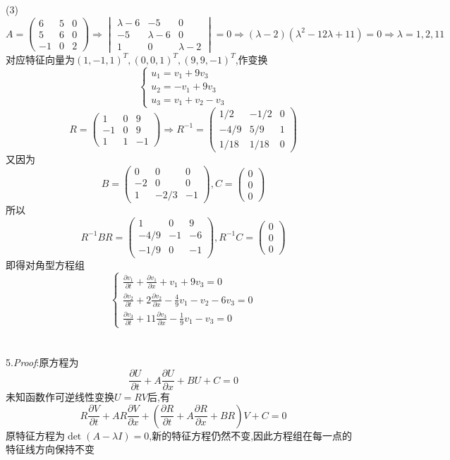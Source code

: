 (3)\[A=
\begin{pmatrix}
6&5&0\\5&6&0\\-1&0&2
\end{pmatrix}\Rightarrow
\begin{vmatrix}
\lambda-6&-5&0\\-5&\lambda-6&0\\1&0&\lambda-2
\end{vmatrix}=0\Rightarrow(\lambda-2)(\lambda^2-12\lambda+11)=0\Rightarrow\lambda=1,2,11\]
对应特征向量为$(1,-1,1)^T,(0,0,1)^T,(9,9,-1)^T$,作变换
\[\begin{cases}
u_1=v_1+9v_3\\
u_2=-v_1+9v_3\\
u_3=v_1+v_2-v_3
\end{cases}\]
\[R=\begin{pmatrix}
1&0&9\\-1&0&9\\1&1&-1
\end{pmatrix}
\Rightarrow
R^{-1}=
\begin{pmatrix}
1/2&-1/2&0\\-4/9&5/9&1\\1/18&1/18&0
\end{pmatrix}\]
又因为
\[B=\begin{pmatrix}
0&0&0\\-2&0&0\\1&-2/3&-1
\end{pmatrix},C=\begin{pmatrix}
0\\0\\0
\end{pmatrix}\]
所以
\[R^{-1}BR=\begin{pmatrix}
1&0&9\\-4/9&-1&-6\\-1/9&0&-1
\end{pmatrix},R^{-1}C=\begin{pmatrix}
0\\0\\0
\end{pmatrix}\]
即得对角型方程组
\[\begin{cases}
\frac{\partial v_1}{\partial t}+\frac{\partial v_1}{\partial x}+v_1+9v_3=0\\
\frac{\partial v_2}{\partial t}+2\frac{\partial v_2}{\partial x}-\frac{4}{9}v_1-v_2-6v_3=0\\
\frac{\partial v_3}{\partial t}+11\frac{\partial v_3}{\partial x}-\frac{1}{9}v_1-v_3=0
\end{cases}\]\\\\
5.\textit{Proof}:原方程为
\[\frac{\partial U}{\partial t}+A\frac{\partial U}{\partial x}+BU+C=0\]
未知函数作可逆线性变换$U=RV$后,有
\[R\frac{\partial V}{\partial t}+AR\frac{\partial V}{\partial x}+\left(\frac{\partial R}{\partial t}+A\frac{\partial R}{\partial x}+BR\right)V+C=0\]
原特征方程为$\det(A-\lambda I)=0$,新的特征方程仍然不变,因此方程组在每一点的特征线方向保持不变